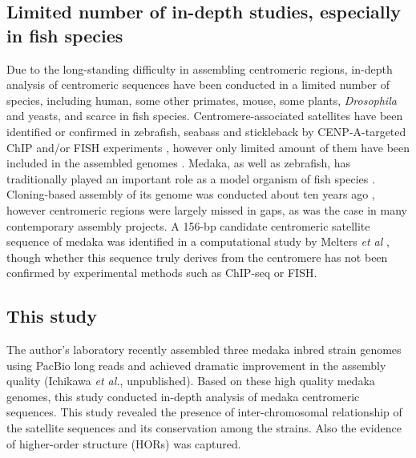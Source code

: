 \subsection*{Limited number of in-depth studies, especially in fish species}
  Due to the long-standing difficulty in assembling centromeric regions, in-depth analysis of centromeric sequences have been conducted in a limited number of species, including human, some other primates, mouse, some plants, \textit{Drosophila} and yeasts, and scarce in fish species. Centromere-associated satellites have been identified or confirmed in zebrafish, seabass and stickleback by CENP-A-targeted ChIP and/or FISH experiments \cite{Phillips2000, Kuznetsova2014, Cech2015}, however only limited amount of them have been included in the assembled genomes \cite{Howe2013, Vij2016, Cech2015}. Medaka, as well as zebrafish, has traditionally played an important role as a model organism of fish species \cite{Wittbrodt2002}. Cloning-based assembly of its genome was conducted about ten years ago \cite{Kasahara2007}, however centromeric regions were largely missed in gaps, as was the case in many contemporary assembly projects. A 156-bp candidate centromeric satellite sequence of medaka was identified in a computational study by Melters \textit{et al} \cite{Melters2013}, though whether this sequence truly derives from the centromere has not been confirmed by experimental methods such as ChIP-seq or FISH.


\subsection*{This study}
  The author's laboratory recently assembled three medaka inbred strain genomes using PacBio long reads and achieved dramatic improvement in the assembly quality (Ichikawa \textit{et al.}, unpublished). Based on these high quality medaka genomes, this study conducted in-depth analysis of medaka centromeric sequences. This study revealed the presence of inter-chromosomal relationship of the satellite sequences and its conservation among the strains. Also the evidence of higher-order structure (HORs) was captured.
